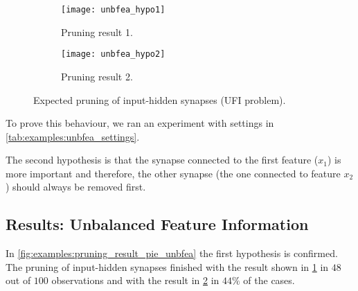 \begin{figure}[H]
\centering
\begin{subfigure}{.4\textwidth}
  \centering
  \texttt{[image: unbfea\_hypo1]}
  \caption{Pruning result 1.}
  \label{fig:examples:unbfea_hypo1}
\end{subfigure}
\begin{subfigure}{.4\textwidth}
  \centering
  \texttt{[image: unbfea\_hypo2]}
  \caption{Pruning result 2.}
  \label{fig:examples:unbfea_hypo2}
\end{subfigure}
\caption{Expected pruning of input-hidden synapses (UFI problem).}
\label{fig:examples:unbfea_hypos}
\end{figure}

To prove this behaviour, we ran an experiment with settings in \cref{tab:examples:unbfea_settings}.

\begin{table}[H]
\centering
{}
\caption{Experiment settings for the UFI example.}
\label{tab:examples:unbfea_settings}
\end{table}

The second hypothesis is that the synapse connected to the first feature ($ x_1 $) is more important and therefore, the other synapse (the one connected to feature $ x_2 $) should always be removed first.

\subsection*{Results: Unbalanced Feature Information}
In \cref{fig:examples:pruning_result_pie_unbfea} the first hypothesis is confirmed. The pruning of input-hidden synapses finished with the result shown in \cref{fig:examples:unbfea_hypo1} in $ 48 $ out of $ 100 $ observations and with the result in \cref{fig:examples:unbfea_hypo2} in $ 44\% $ of the cases.

